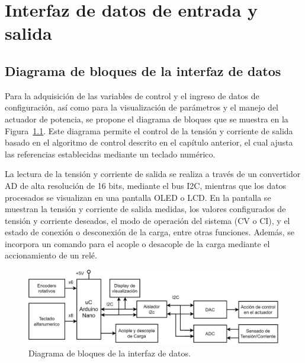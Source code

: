 \chapter{Interfaz de datos de entrada y salida}

\label{C:Interfaz de datos de entrada y salida}

\section{Diagrama de bloques de la interfaz de datos}
Para la adquisición de las variables de control y el ingreso de datos de configuración, así como para la visualización de parámetros y el manejo del actuador de potencia, se propone el diagrama de bloques que se muestra en la Figura~\ref{F:diagrama_digital}. Este diagrama permite el control de la tensión y corriente de salida basado en el algoritmo de control descrito en el capítulo anterior, el cual ajusta las referencias establecidas mediante un teclado numérico.\par 

La lectura de la tensión y corriente de salida se realiza a través de un convertidor AD de alta resolución de 16 bits, mediante el bus I2C, mientras que los datos procesados se visualizan en una pantalla OLED o LCD. En la pantalla se muestran la tensión y corriente de salida medidas, los valores configurados de tensión y corriente deseados, el modo de operación del sistema (CV o CI), y el estado de conexión o desconexión de la carga, entre otras funciones. Además, se incorpora un comando para el acople o desacople de la carga mediante el accionamiento de un relé.\par 

\begin{figure} [H]
    \centering
    \includegraphics[width=\textwidth]{./imagenes/diagrama_digital.jpg}
    \caption{Diagrama de bloques de la interfaz de datos.}
    \label{F:diagrama_digital}
\end{figure}\par 


